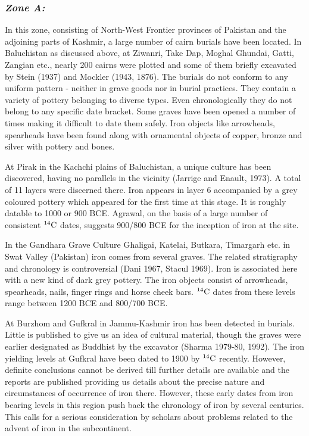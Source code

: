 \vspace{-.3cm}

\subsubsection*{\textit{Zone A:}}

\vspace{-.2cm}

In this zone, consisting of North-West Frontier provinces of Pakistan and the adjoining parts of Kashmir, a large number of cairn burials have been located. In Baluchistan as discussed above, at Ziwanri, Take Dap, Moghal Ghundai, Gatti, Zangian etc., nearly 200 cairns were plotted and some of them briefly excavated by Stein (1937) and Mockler (1943, 1876). The burials do not conform to any uniform pattern - neither in grave goods nor in burial practices. They contain a variety of pottery belonging to diverse types. Even chronologically they do not belong to any specific date bracket. Some graves have been opened a number of times making it difficult to date them safely. Iron objects like arrowheads, spearheads have been found along with ornamental objects of copper, bronze and silver with pottery and bones.

At Pirak in the Kachchi plains of Baluchistan, a unique culture has been discovered, having no parallels in the vicinity (Jarrige and Enault, 1973). A total of 11 layers were discerned there. Iron appears in layer 6 accompanied by a grey coloured pottery which appeared for the first time at this stage. It is roughly datable to 1000 or 900 BCE. Agrawal, on the basis of a large number of consistent $^{14}{\rm C}$ dates, suggests 900/800 BCE for the inception of iron at the site.

In the Gandhara Grave Culture Ghaligai, Katelai, Butkara, Timargarh etc. in Swat Valley (Pakistan) iron comes from several graves. The related stratigraphy and chronology is controversial (Dani 1967, Stacul 1969). Iron is associated here with a new kind of dark grey pottery. The iron objects consist of arrowheads, spearheads, nails, finger rings and horse cheek bars. $^{14}{\rm C}$ dates from these levels range between 1200 BCE and 800/700 BCE.

At Burzhom and Gufkral in Jammu-Kashmir iron has been detected in burials. Little is published to give us an idea of cultural material, though the graves were earlier designated as Buddhist by the excavator (Sharma 1979-80, 1992). The iron yielding levels at Gufkral have been dated to 1900 by $^{14}{\rm C}$ recently. However, definite conclusions cannot be derived till further details are available and the reports are published providing us details about the precise nature and circumstances of occurrence of iron there. However, these early dates from iron bearing levels in this region push back the chronology of iron by several centuries. This calls for a serious consideration by scholars about problems related to the advent of iron in the subcontinent.


